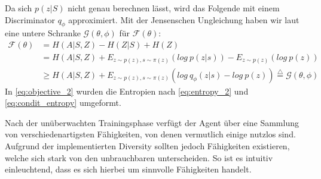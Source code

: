 Da sich $ p(z|S) $ nicht genau berechnen lässt, wird das Folgende mit einem Discriminator $ q_\phi $ approximiert. Mit der Jensenschen Ungleichung haben wir laut \cite{diversity_eysenbach} eine untere Schranke $ \mathcal{G}(\theta, \phi) $ für $ \mathcal{F}(\theta) $:
\begin{align}
    \mathcal{F}(\theta) & = H(A|S,Z) - H(Z|S) + H(Z) \nonumber\\
    & = H(A|S,Z) + E_{z \sim p(z), s \sim \pi(z)}(log\ p(z | s)) - E_{z \sim p(z)}(log\ p(z)) \label{eq:objective_2}\\
    & \ge H(A|S,Z) + E_{z \sim p(z), s \sim \pi(z)}(log\ q_\phi(z | s) - log\ p(z)) \stackrel{\triangle}{=} \mathcal{G}(\theta, \phi) \nonumber
\end{align}
In \eqref{eq:objective_2} wurden die Entropien nach \eqref{eq:entropy_2} und \eqref{eq:condit_entropy} umgeformt.

\smallspace

Nach der unüberwachten Trainingsphase verfügt der Agent über eine Sammlung von verschiedenartigsten Fähigkeiten, von denen vermutlich einige nutzlos sind. Aufgrund der implementierten Diversity sollten jedoch Fähigkeiten existieren, welche sich stark von den unbrauchbaren unterscheiden. So ist es intuitiv einleuchtend, dass es sich hierbei um sinnvolle Fähigkeiten handelt.

